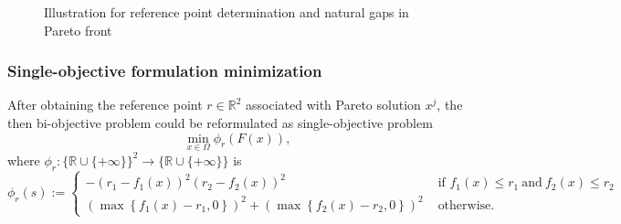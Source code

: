 \documentclass[11pt,oneside,onecolumn,openright]{article}
\begin{document}
    \begin{figure}[H] 
    \centering 
          \hspace{0.3cm} 
          \caption{Illustration for reference point determination and natural gaps in Pareto front} 
            \label{fig:refall}
    \end{figure}

    \subsubsection*{Single-objective formulation minimization}
    After obtaining the reference point $r\in \mathbb{R}^2$ associated with Pareto solution $x^j$, the then bi-objective problem could be reformulated as single-objective problem 
    \begin{equation}\label{equ:reform}
    \min _{x \in \Omega} \phi_{r}(F(x)),
    \end{equation}
    where $\phi_{r}:\{\mathbb{R} \cup\{+\infty\}\}^{2} \rightarrow \{\mathbb{R} \cup\{+\infty\}\}$ is
    \begin{equation}
    \phi_{r}(s):= \begin{cases}-\left(r_{1}-f_{1}(x)\right)^{2}\left(r_{2}-f_{2}(x)\right)^{2} & \text { if } f_{1}(x) \leq r_1\ \text{and}\ f_{2}(x) \leq r_2 \\ \left(\max \left\{f_{1}(x)-r_{1}, 0\right\}\right)^{2}+\left(\max \left\{f_{2}(x)-r_{2}, 0\right\}\right)^{2} & \text { otherwise. }\end{cases}
    \end{equation}
\end{document}
